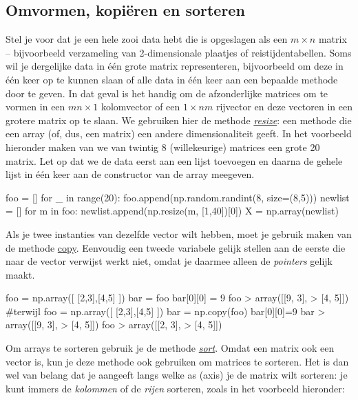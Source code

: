 \subsection{Omvormen, kopiëren en sorteren}
Stel je voor dat je een hele zooi data hebt die is opgeslagen als een $m \times n$ matrix – bijvoorbeeld verzameling van 2-dimensionale plaatjes of reistijdentabellen. Soms wil je dergelijke data in één grote matrix representeren, bijvoorbeeld om deze in één keer op te kunnen slaan of alle data in één keer aan een bepaalde methode door te geven. In dat geval is het handig om de afzonderlijke matrices om te vormen in een $mn \times 1$ kolomvector of een $1 \times nm$ rijvector en deze vectoren in een grotere matrix op te slaan. We gebruiken hier de methode \textit{\href{https://docs.scipy.org/doc/numpy/reference/generated/numpy.resize.html}{resize}}: een methode die een array (of, dus, een matrix) een andere dimensionaliteit geeft. In het voorbeeld hieronder maken van we van twintig 8  (willekeurige) matrices een grote 20  matrix. Let op dat we de data eerst aan een lijst toevoegen en daarna de gehele lijst in één keer aan de constructor van de array meegeven.

\begin{python}
foo = []
for _ in range(20):
    foo.append(np.random.randint(8, size=(8,5)))
newlist = []
for m in foo:
    newlist.append(np.resize(m, [1,40])[0])
X = np.array(newlist)
\end{python}

Als je twee instanties van dezelfde vector wilt hebben, moet je gebruik maken van de methode \href{https://docs.scipy.org/doc/numpy/reference/generated/numpy.copy.html}{copy}. Eenvoudig een tweede variabele gelijk stellen aan de eerste die naar de vector verwijst werkt niet, omdat je daarmee alleen de \textit{pointers} gelijk maakt.

\begin{python}
foo = np.array([ [2,3],[4,5] ])
bar = foo
bar[0][0] = 9
foo
> array([[9, 3],
>       [4, 5]])
#terwijl
foo = np.array([ [2,3],[4,5] ])
bar = np.copy(foo)
bar[0][0]=9
bar
> array([[9, 3],
>       [4, 5]])
foo
> array([[2, 3],
>       [4, 5]])

\end{python}

Om arrays te sorteren gebruik je de methode \textit{\href{https://docs.scipy.org/doc/numpy/reference/generated/numpy.sort.html}{sort}}. Omdat een matrix ook een vector is, kun je deze methode ook gebruiken om matrices te sorteren. Het is dan wel van belang dat je aangeeft langs welke as (axis) je de matrix wilt sorteren: je kunt immers de \textit{kolommen} of de \textit{rijen} sorteren, zoals in het voorbeeld hieronder: 


